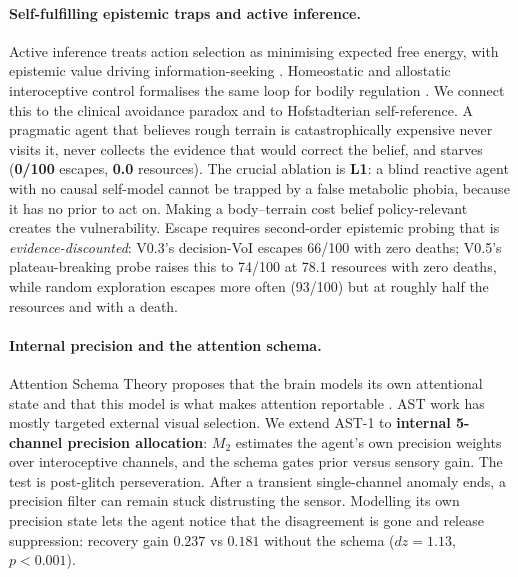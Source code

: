 \documentclass[11pt,a4paper]{article}
\begin{document}
\paragraph{Self-fulfilling epistemic traps and active inference.}
Active inference treats action selection as minimising expected free energy, with epistemic value driving information-seeking \citep{friston2015active,tschantz2020learning}. Homeostatic and allostatic interoceptive control formalises the same loop for bodily regulation \citep{tschantz2022simulating}. We connect this to the clinical avoidance paradox and to Hofstadterian self-reference. A pragmatic agent that believes rough terrain is catastrophically expensive never visits it, never collects the evidence that would correct the belief, and starves (\textbf{0/100} escapes, \textbf{0.0} resources). The crucial ablation is \textbf{L1}: a blind reactive agent with no causal self-model cannot be trapped by a false metabolic phobia, because it has no prior to act on. Making a body--terrain cost belief policy-relevant creates the vulnerability. Escape requires second-order epistemic probing that is \emph{evidence-discounted}: V0.3's decision-VoI escapes 66/100 with zero deaths; V0.5's plateau-breaking probe raises this to 74/100 at 78.1 resources with zero deaths, while random exploration escapes more often (93/100) but at roughly half the resources and with a death.

\paragraph{Internal precision and the attention schema.}
Attention Schema Theory proposes that the brain models its own attentional state and that this model is what makes attention reportable \citep{graziano2013consciousness,wilterson2021attention}. AST work has mostly targeted external visual selection. We extend AST-1 to \textbf{internal 5-channel precision allocation}: $M_2$ estimates the agent's own precision weights over interoceptive channels, and the schema gates prior versus sensory gain. The test is post-glitch perseveration. After a transient single-channel anomaly ends, a precision filter can remain stuck distrusting the sensor. Modelling its own precision state lets the agent notice that the disagreement is gone and release suppression: recovery gain $\mathbf{0.237}$ vs $\mathbf{0.181}$ without the schema ($dz=1.13$, $p<0.001$).
\end{document}

